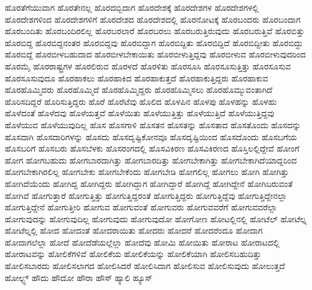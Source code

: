 {ಹೊರತೆಗೆಯುವಾಗ
ಹೊರತೇನಲ್ಲ
ಹೊರದಬ್ಬಿದಾಗ
ಹೊರದೇಶಕ್ಕೆ
ಹೊರದೇಶಗಳ
ಹೊರದೇಶಗಳಲ್ಲಿ
ಹೊರದೇಶಗಳಿಂದ
ಹೊರದೇಶಗಳಿಗೆ
ಹೊರದೇಶದ
ಹೊರದೇಶದಲ್ಲಿ
ಹೊರನೋಟಕ್ಕೆ
ಹೊರಬಂದರು
ಹೊರಬಂದಾಗ
ಹೊರಬಂದಿತು
ಹೊರಬಂದಿರಲಿಲ್ಲ
ಹೊರಬರಲಾರೆ
ಹೊರಬರಲು
ಹೊರಬರುತ್ತಿರುವುದು
ಹೊರಬರುತ್ತಿವೆ
ಹೊರಬಿತ್ತು
ಹೊರಬಿದ್ದ
ಹೊರಬಿದ್ದನಂತರ
ಹೊರಬಿದ್ದವು
ಹೊರಬಿದ್ದಾಗ
ಹೊರಬಿದ್ದಿತು
ಹೊರಬಿದ್ದಿದೆ
ಹೊರಬಿದ್ದೀತು
ಹೊರಬಿದ್ದು
ಹೊರಬಿದ್ದೆ
ಹೊರಬೀಳಬಹುದಾದ
ಹೊರಬೀಳಬೇಕಾಯಿತು
ಹೊರಬೀಳುತ್ತಿದ್ದವು
ಹೊರಬೀಳುವ
ಹೊರಬೀಳುವುದರಿಂದ
ಹೊರಮೈ
ಹೊರರಾಷ್ಟ್ರಗಳ
ಹೊರಲಿರುವ
ಹೊರಳದೆ
ಹೊರಳಿತು
ಹೊರಸೂಸಿ
ಹೊರಸೂಸುತ್ತಿತ್ತು
ಹೊರಸೂಸುವ
ಹೊರಸೂಸುವುದೂ
ಹೊರಹಾಕಲು
ಹೊರಹಾಕಿದ
ಹೊರಹಾಕುತ್ತದೆ
ಹೊರಹಾಕುತ್ತಿದ್ದರು
ಹೊರಹಾಕುವ
ಹೊರಹೊಮ್ಮಿದರು
ಹೊರಹೊಮ್ಮಿದೆ
ಹೊರಹೊಮ್ಮಿದ್ದರು
ಹೊರಹೊಮ್ಮಿಸಲು
ಹೊರಹೊಮ್ಮುವಂತಾಗಿದೆ
ಹೊರಿಸದಿದ್ದರೆ
ಹೊರಿಸುತ್ತಿದ್ದರು
ಹೊರೆ
ಹೊರೆಟೆವು
ಹೊಲಿದ
ಹೊಳಪಿನ
ಹೊಳಪು
ಹೊಳಹನ್ನು
ಹೊಳಹು
ಹೊಳೆದಂತೆ
ಹೊಳೆದವು
ಹೊಳೆಯತ್ತವೆ
ಹೊಳೆಯಿತು
ಹೊಳೆಯುತ್ತಿತ್ತು
ಹೊಳೆಯುತ್ತಿದೆ
ಹೊಳೆಯುತ್ತಿದ್ದವು
ಹೊಳೆಯುವ
ಹೊಳೆಯುವುದಿಲ್ಲ
ಹೊಸ
ಹೊಸಗಾಳಿ
ಹೊಸತನ
ಹೊಸತನ್ನು
ಹೊಸತಾದ
ಹೊಸತೊಂದು
ಹೊಸದನ್ನು
ಹೊಸದಾಗಿ
ಹೊಸದಾರಿಗಳನ್ನು
ಹೊಸದು
ಹೊಸದೃಷ್ಟಿಕೋನವೂ
ಹೊಸದೃಷ್ಟಿಯಿಂದ
ಹೊಸದೊಂದು
ಹೊಸಬಗೆಯ
ಹೊಸಬರಿಗೆ
ಹೊಸಬರು
ಹೊಸಬೆಳಕು
ಹೊಸರಂಗದಲ್ಲಿ
ಹೊಸವಿಕಿರಣ
ಹೊಸವಿಕಿರಣದ
ಹೊಸ್ತಿಲಲ್ಲಿದ್ದೇವೆ
ಹೋಂಗೆ
ಹೋಗ
ಹೋಗಬಹುದು
ಹೋಗಬಾರದಾಗಿತ್ತು
ಹೋಗಬಾರದಿತ್ತು
ಹೋಗಬೇಕಾಗಿತ್ತು
ಹೋಗಬೇಕಾಗಿದೆಯಾದ್ದರಿಂದ
ಹೋಗಬೇಕಾಗಿರಲಿಲ್ಲ
ಹೋಗಬೇಕು
ಹೋಗಬೇಕೆಂದು
ಹೋಗಬೇಡಿ
ಹೋಗಲಿಲ್ಲ
ಹೋಗಲು
ಹೋಗಿ
ಹೋಗಿತ್ತು
ಹೋಗಿದೆಯೆಂದು
ಹೋಗಿದ್ದ
ಹೋಗಿದ್ದರು
ಹೋಗಿದ್ದಾಗ
ಹೋಗಿದ್ದಾರೆ
ಹೋಗಿದ್ದೆ
ಹೋಗಿದ್ದೇನೆ
ಹೋಗಿಬರುವಂತೆ
ಹೋಗಿವೆ
ಹೋಗುತ್ತಾರೆ
ಹೋಗುತ್ತಿತ್ತು
ಹೋಗುತ್ತಿದ್ದರಂತೆ
ಹೋಗುತ್ತಿದ್ದರು
ಹೋಗುತ್ತಿದ್ದೆವು
ಹೋಗುತ್ತಿದ್ದೇನಲ್ಲಾ
ಹೋಗುತ್ತಿದ್ದೇನೆ
ಹೋಗುತ್ತೀರಿ
ಹೋಗುವ
ಹೋಗುವಂತೆ
ಹೋಗುವರು
ಹೋಗುವವರೆಗೆ
ಹೋಗುವವರೆಲ್ಲಾ
ಹೋಗುವುದನ್ನು
ಹೋಗುವುದಿಲ್ಲ
ಹೋಗುವುದು
ಹೋಗುವುದೋ
ಹೋಗೋಣ
ಹೋಟಲ್ಲಿನಲ್ಲಿ
ಹೋಟೆಲ್
ಹೋಟೆಲ್ನ
ಹೋಟೆಲ್ನಲ್ಲಿ
ಹೋದ
ಹೋದಂತೆ
ಹೋದರಾಯಿತು
ಹೋದರು
ಹೋದರೆ
ಹೋದರೆಂದೂ
ಹೋದಾಗ
ಹೋದಾಗಲೆಲ್ಲಾ
ಹೋದೆ
ಹೋದೆಡೆಯಲ್ಲೆಲ್ಲಾ
ಹೋದೆವು
ಹೋಮಿ
ಹೋಯಿತು
ಹೋರಾಟ
ಹೋರಾಟದಲ್ಲಿ
ಹೋರಾಟವನ್ನು
ಹೋಲಿಕೆಗಳಿವೆ
ಹೋಲಿಕೆಯ
ಹೋಲಿಕೆಯನ್ನು
ಹೋಲಿಕೆಯಾಗಿ
ಹೋಲಿಸಬಹುದಿತ್ತು
ಹೋಲಿಸಬಾರದು
ಹೋಲಿಸಲಾಗದ
ಹೋಲಿಸಿದರೆ
ಹೋಲಿಸಿದಾಗ
ಹೋಲಿಸುವ
ಹೋಲಿಸುವುದು
ಹೋಲುತ್ತದೆ
ಹೋಲ್ಟ್ಸ್
ಹೌದು
ಹೌದೋ
ಹೌರಾ
ಹೌಸ್
ಹ್ಯಾಲಿ
ಹ್ಯೂಸ್
}

